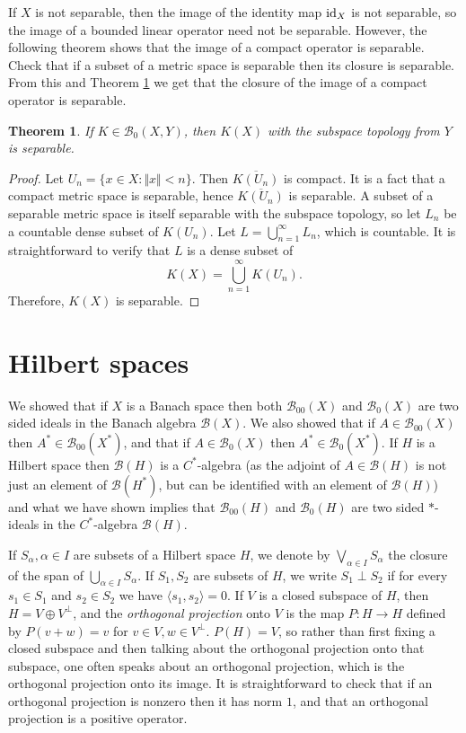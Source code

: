 \documentclass{article}
\newcommand{\inner}[2]{\langle #1, #2 \rangle}
\newcommand{\id}{\ensuremath\mathrm{id}}
\newcommand{\norm}[1]{\Vert #1 \Vert}
\newtheorem{theorem}{Theorem}
\begin{document}
If $X$ is not separable, then
the image of the identity map $\id_X$ is not separable, so the image of a bounded linear operator need not be separable. However, the following theorem shows that the  image of a compact operator is separable. Check that if a subset of a metric space is separable then its closure
is separable. From this and Theorem \ref{separable}  we get that the closure of the image of a compact operator is separable.

\begin{theorem}
If $K \in \mathscr{B}_0(X,Y)$, then $K(X)$ with the subspace topology from $Y$ is separable.
\label{separable}
\end{theorem}
\begin{proof}
Let $U_n=\{x \in X: \norm{x} < n\}$. Then $\overline{K(U_n)}$ is compact. 
It is a fact that a compact metric space is separable, hence $\overline{K(U_n)}$ is separable. A subset of a separable metric space is itself separable with 
the subspace topology, so
 let $L_n$ be a countable dense subset of $K(U_n)$. 
Let $L=\bigcup_{n=1}^\infty L_n$, which is countable. It is straightforward to verify that $L$ is a dense subset of
\[
K(X) = \bigcup_{n=1}^\infty K(U_n).
\]
Therefore, $K(X)$ is separable.
\end{proof}






\section{Hilbert spaces}
We showed that if $X$ is a Banach space then both $\mathscr{B}_{00}(X)$ and $\mathscr{B}_0(X)$ are  two sided ideals in the Banach algebra $\mathscr{B}(X)$. We also showed
that if $A \in \mathscr{B}_{00}(X)$ then $A^* \in \mathscr{B}_{00}(X^*)$, and that if $A \in \mathscr{B}_0(X)$ then $A^* \in \mathscr{B}_0(X^*)$. If $H$ is a Hilbert space then $\mathscr{B}(H)$ is a $C^*$-algebra (as the adjoint
of $A \in \mathscr{B}(H)$ is not just an element of $\mathscr{B}(H^*)$, but can be identified with an element of $\mathscr{B}(H)$)
and what we have shown implies that $\mathscr{B}_{00}(H)$ and $\mathscr{B}_0(H)$ are two sided $*$-ideals in the $C^*$-algebra $\mathscr{B}(H)$.


If $S_\alpha, \alpha \in I$ are subsets of a Hilbert space $H$, we denote by $\bigvee_{\alpha \in I} S_\alpha$ the closure of the span
of $\bigcup_{\alpha \in I} S_\alpha$.
If $S_1,S_2$ are subsets of $H$, we write $S_1 \perp S_2$ if for every $s_1 \in S_1$ and
$s_2 \in S_2$ we have $\inner{s_1}{s_2}=0$.
If $V$ is a closed subspace of $H$, then $H = V \oplus V^\perp$, and the {\em orthogonal projection} onto $V$ is the map
$P:H \to H$ defined by $P(v+w)=v$ for $v \in V, w\in V^\perp$. $P(H)=V$, so rather than first fixing a closed subspace and then
talking about the orthogonal projection onto that subspace, one often speaks about an orthogonal projection, which is the orthogonal projection onto its image.
It is straightforward to check that if an orthogonal projection is nonzero then it has norm $1$, and
that an orthogonal projection is a positive operator.
\end{document}
